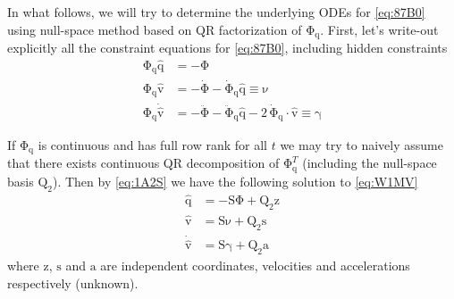 \documentclass{scrartcl}
\newcommand\mMat[1]{\ensuremath{\boldsymbol{\mathrm{#1}}}}
\newcommand\mVec[1]{\ensuremath{\boldsymbol{\mathrm{#1}}}}
\begin{document}
In what follows, we will try to determine the underlying ODEs for
\eqref{eq:87B0} using null-space method based on QR factorization of
$\mMat{\Phi}_{\mVec{q}}$. First, let's write-out explicitly all the constraint
equations for \eqref{eq:87B0}, including hidden constraints
\begin{subequations}
\label{eq:W1MV}
\begin{align}
  \mMat{\Phi}_{\mVec{q}} \mVec{\hat q}
& = - \mVec{\Phi}
\\
\mMat{\Phi}_{\mVec{q}} \mVec{\hat v}
& = - \mVec{\dot \Phi}
- \mMat{\dot \Phi}_{\mVec{q}} \mVec{\hat q}
    \equiv \mVec{\nu}
\\
\mMat{\Phi}_{\mVec{q}} \mVec{\dot {\hat v}}
& = - \mVec{\ddot \Phi}
- \mVec{\ddot \Phi}_{\mVec{q}} \mVec{\hat q}
    - 2 \, \mMat{\dot \Phi}_{\mVec{q}}
    \cdot \mVec{\hat v}
    \equiv \mVec{\gamma}
\end{align}
\end{subequations}

If $\mMat{\Phi}_{\mVec{q}}$ is continuous and has full row rank for all $t$ we
may try to naively assume that there exists continuous QR decomposition of
$\mMat{\Phi}_{\mVec{q}}^T$ (including the null-space basis $\mMat{Q}_2$). Then
by \eqref{eq:1A2S} we have the following solution to \eqref{eq:W1MV}
\begin{subequations}
\label{eq:KLREN}
\begin{align}
  \mVec{\hat q}
  & = - \mMat{S} \mVec{\Phi} + \mMat{Q}_2 \mVec{z}
  \label{eq:TMOIZ}
\\
  \mVec{\hat v}
  & = \mMat{S} \mVec{\nu} + \mMat{Q}_2 \mVec{s}
  \label{eq:J53RJ}
\\
  \mVec{\dot {\hat v}}
  & = \mMat{S} \mVec{\gamma} + \mMat{Q}_2 \mVec{a}
  \label{eq:XQKT1}
\end{align}
\end{subequations}
where $\mVec{z}$, $\mVec{s}$ and $\mVec{a}$ are
independent coordinates, velocities and accelerations respectively (unknown).
\end{document}
